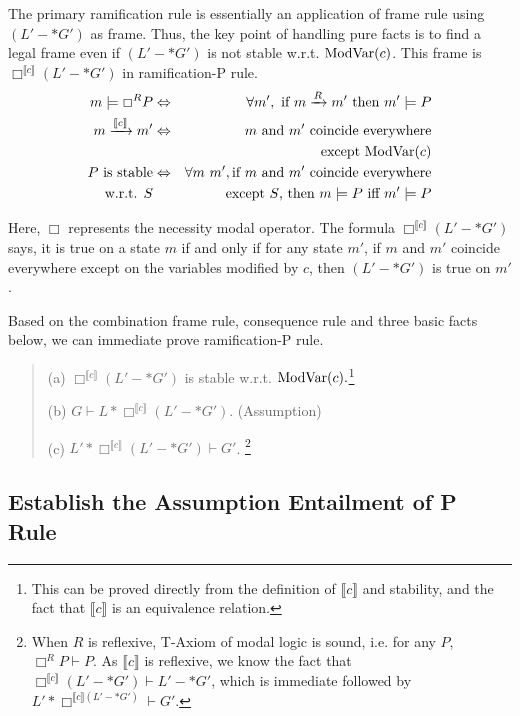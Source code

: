 The primary ramification rule is essentially an application of frame rule using $(L' -* G')$ as frame.
Thus, the key point of handling pure facts is to find a legal frame even if $(L' -* G')$ is not stable w.r.t. $\text{ModVar}(c)$. This frame is $\Box^{\llbracket c \rrbracket} (L' -* G')$ in ramification-P rule.
\begin{eqnarray*}
m \models \Box^R P &  \Leftrightarrow  & \forall m', \text{ if } m\xrightarrow{R}m' \text{ then } m' \models P \\
m \xrightarrow{\llbracket c \rrbracket} m' & \Leftrightarrow &   \text{$m$ and $m'$ coincide everywhere} \\
&& \text{except $\MV(c)$} \\
P \text{ is stable} &  \Leftrightarrow  & \forall m \ m',  \text{if $m$ and $m'$ coincide everywhere} \\
\text{w.r.t. $S$} && \text{except $S$, then $m \models P$ iff $m' \models P$}
\end{eqnarray*}

Here, $\Box$ represents the necessity modal operator. The formula $\Box^{\llbracket c \rrbracket} (L' -* G')$ says, it is true on a state $m$ if and only if for any state $m'$, if $m$ and $m'$
coincide everywhere except on the variables modified by $c$, then $(L' -* G')$ is true on $m'$. 

Based on the combination frame rule, consequence rule and three basic facts below, we can immediate prove ramification-P rule.
\begin{quotation}
(a) $\Box^{\llbracket c \rrbracket} (L' -* G')$ is stable w.r.t. $\text{ModVar}(c).$\footnote{This can be proved directly from the definition of $\llbracket c \rrbracket$ and stability, and the fact that $\llbracket c \rrbracket$ is an equivalence relation.}

(b) $G \vdash L * \Box^{\llbracket c \rrbracket} (L' -* G')$. (Assumption)

(c) $L' *  \Box^{\llbracket c \rrbracket} (L' -* G') \vdash G'$. \footnote{When $R$ is reflexive, T-Axiom of modal logic is sound, i.e. for any $P$, $\Box^R P \vdash P$. As $\llbracket c \rrbracket$ is reflexive, we know the fact that $\Box^{\llbracket c \rrbracket} (L' -* G') \vdash L' -* G'$, which is immediate followed by $L' *  \Box^{\llbracket c \rrbracket (L' -* G')} \vdash G'$.}
\end{quotation}

\subsection{Establish the Assumption Entailment of P Rule}

